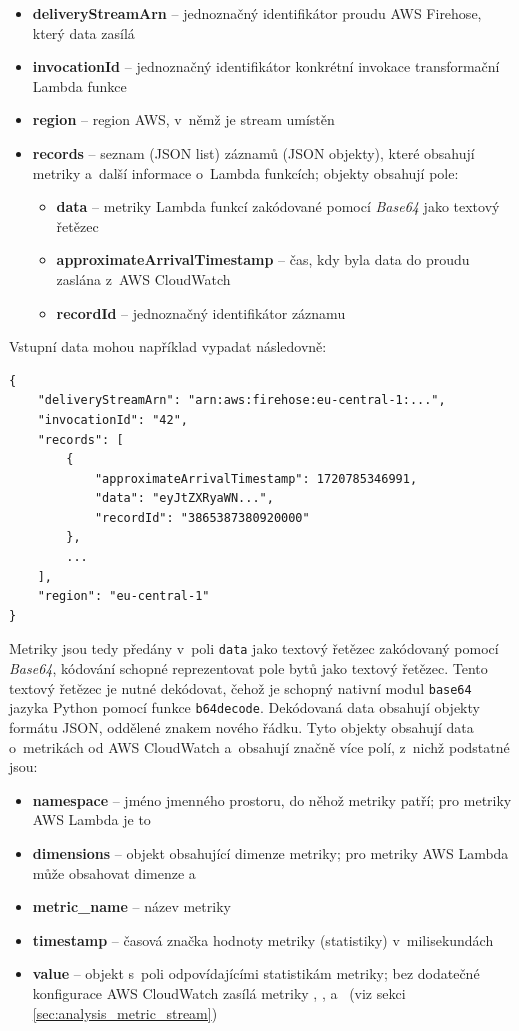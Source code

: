 \documentclass[czech, ing, kiv, he, iso690]{fasthesis}
\begin{document}
\begin{itemize}
    \item \textbf{deliveryStreamArn} -- jednoznačný identifikátor proudu AWS Firehose, který data zasílá
    \item \textbf{invocationId} -- jednoznačný identifikátor konkrétní invokace transformační Lambda funkce
    \item \textbf{region} -- region AWS, v~němž je stream umístěn
    \item \textbf{records} -- seznam (JSON list) záznamů (JSON objekty), které obsahují metriky a~další informace o~Lambda funkcích; objekty obsahují pole:
    \begin{itemize}
        \item \textbf{data} -- metriky Lambda funkcí zakódované pomocí \emph{Base64} jako textový řetězec
        \item \textbf{approximateArrivalTimestamp} -- čas, kdy byla data do proudu zaslána z~AWS CloudWatch
        \item \textbf{recordId} -- jednoznačný identifikátor záznamu
    \end{itemize}
\end{itemize}

Vstupní data mohou například vypadat následovně:

\begin{verbatim}
{
    "deliveryStreamArn": "arn:aws:firehose:eu-central-1:...",
    "invocationId": "42",
    "records": [
        {
            "approximateArrivalTimestamp": 1720785346991,
            "data": "eyJtZXRyaWN...",
            "recordId": "3865387380920000"
        },
        ...
    ],
    "region": "eu-central-1"
}
\end{verbatim}

Metriky jsou tedy předány v~poli \verb|data| jako textový řetězec zakódovaný pomocí \emph{Base64}, kódování schopné reprezentovat pole bytů jako textový řetězec. Tento textový řetězec je nutné dekódovat, čehož je schopný nativní modul \verb|base64| jazyka Python pomocí funkce \verb|b64decode|. Dekódovaná data obsahují objekty formátu JSON, oddělené znakem nového řádku. Tyto objekty obsahují data o~metrikách od AWS CloudWatch a~obsahují značně více polí, z~nichž podstatné jsou:

\begin{itemize}
    \item \textbf{namespace} -- jméno jmenného prostoru, do něhož metriky patří; pro metriky AWS Lambda je to 
    \item \textbf{dimensions} -- objekt obsahující dimenze metriky; pro metriky AWS Lambda může obsahovat dimenze  a~
    \item \textbf{metric\_name} -- název metriky
    \item \textbf{timestamp} -- časová značka hodnoty metriky (statistiky) v~milisekundách
    \item \textbf{value} -- objekt s~poli odpovídajícími statistikám metriky; bez dodatečné konfigurace AWS CloudWatch zasílá metriky , ,  a~ (viz sekci \ref{sec:analysis_metric_stream})
\end{itemize}
\end{document}
